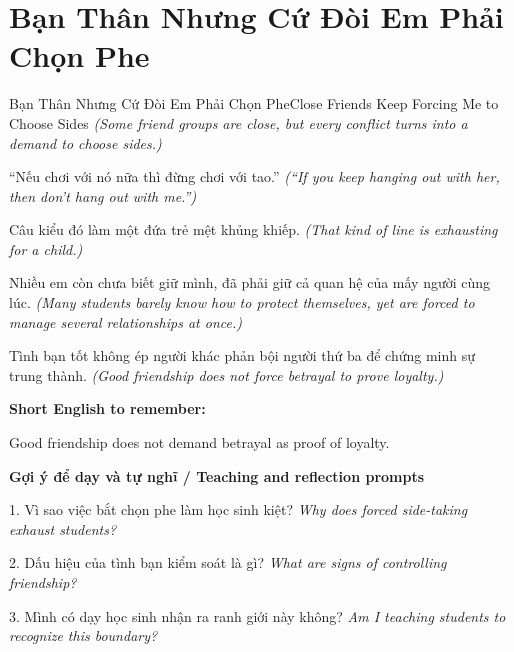 \section{Bạn Thân Nhưng Cứ Đòi Em Phải Chọn Phe}
\begin{truyen}{Bạn Thân Nhưng Cứ Đòi Em Phải Chọn Phe}{Close Friends Keep Forcing Me to Choose Sides}
\textit{(Some friend groups are close, but every conflict turns into a demand to choose sides.)}

“Nếu chơi với nó nữa thì đừng chơi với tao.”
\textit{(“If you keep hanging out with her, then don't hang out with me.”)}

Câu kiểu đó làm một đứa trẻ mệt khủng khiếp.
\textit{(That kind of line is exhausting for a child.)}

Nhiều em còn chưa biết giữ mình, đã phải giữ cả quan hệ của mấy người cùng lúc.
\textit{(Many students barely know how to protect themselves, yet are forced to manage several relationships at once.)}

\end{truyen}

\begin{baihoc}
Tình bạn tốt không ép người khác phản bội người thứ ba để chứng minh sự trung thành.
\textit{(Good friendship does not force betrayal to prove loyalty.)}
\end{baihoc}

\begin{ghinhoanh}
\textbf{Short English to remember:}

Good friendship does not demand betrayal as proof of loyalty.

\end{ghinhoanh}

\begin{tuhocnhanh}
\textbf{Gợi ý để dạy và tự nghĩ / Teaching and reflection prompts}

1. Vì sao việc bắt chọn phe làm học sinh kiệt? \textit{Why does forced side-taking exhaust students?}

2. Dấu hiệu của tình bạn kiểm soát là gì? \textit{What are signs of controlling friendship?}

3. Mình có dạy học sinh nhận ra ranh giới này không? \textit{Am I teaching students to recognize this boundary?}
\end{tuhocnhanh}
\ngancach

